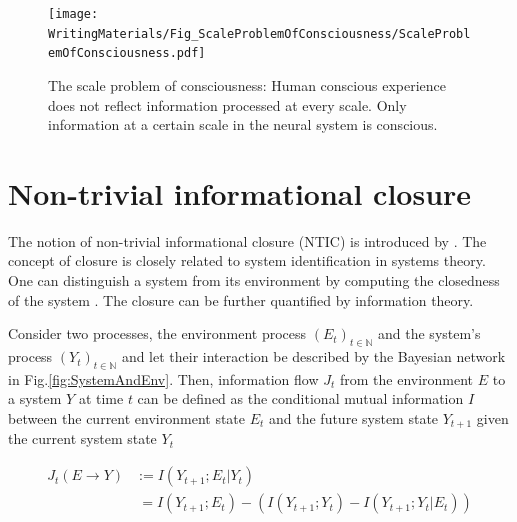 \documentclass[utf8]{article}
\begin{document}
		\begin{figure}[H]
		    \centering
		    \label{fig:scaleproblem}
			\texttt{[image: WritingMaterials/Fig\_ScaleProblemOfConsciousness/ScaleProblemOfConsciousness.pdf]}
			\caption{The scale problem of consciousness: Human conscious experience does not reflect information processed at every scale. Only information at a certain scale in the neural system is conscious.}
	   	\end{figure}


	\section{Non-trivial informational closure} \label{sec:Non-trivial informational closure}
		The notion of non-trivial informational closure (NTIC) is introduced by \cite{BERTSCHINGER.2006}. The concept of closure is closely related to system identification in systems theory. One can distinguish a system from its environment by computing the closedness of the system \citep{maturana1991autopoiesis, rosen1991life, pattee2012evolving, luhmann1995probleme}. The closure can be further quantified by information theory.



			\noindent
			Consider two processes, the environment process $(E_t)_{t \in \mathbb{N}}$ and the system's process $(Y_t)_{t \in \mathbb{N}}$ and let their interaction be described by the Bayesian network in Fig.\ref{fig:SystemAndEnv}. Then, information flow $J_{t}$ from the environment $E$ to a system $Y$ at time $t$ can be defined as the conditional mutual information $I$ between the current environment state $E_{t}$  and the future system state $Y_{t+1}$ given the current system state $Y_{t}$

				\begin{equation}
    				\label{eq:InformationFlow}
    				\left.\begin{array}
    				{rl}{J_{t}(E \rightarrow Y )} & {:= I(Y_{t+1};E_{t}|Y_{t})} \\
    				{ } & { \ = I(Y_{t+1};E_{t}) - (I(Y_{t+1};Y_{t})-I(Y_{t+1};Y_{t}|E_{t}))}
    				\end{array}\right.
				\end{equation}
\end{document}
